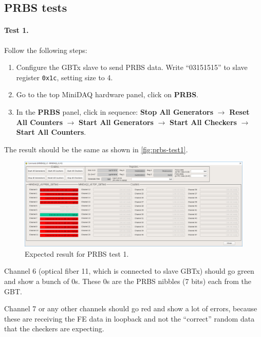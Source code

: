 \subsection{PRBS tests}

\paragraph{Test 1.} Follow the following steps:
\begin{enumerate}
    \item Configure the GBTx slave to send PRBS data. Write ``03151515'' to
        slave register \texttt{0x1c}, setting size to 4.
    \item Go to the top MiniDAQ hardware panel, click on \textbf{PRBS}.
    \item In the \textbf{PRBS} panel, click in sequence:
        \textbf{Stop All Generators} $\to$ \textbf{Reset All Counters} $\to$
        \textbf{Start All Generators} $\to$ \textbf{Start All Checkers} $\to$
        \textbf{Start All Counters}.
\end{enumerate}

The result should be the same as shown in \autoref{fig:prbs-test1}.

\begin{figure}[ht]
    \centering
    \includegraphics[width=\textwidth]{res/prbs_test1.png}
    \caption{Expected result for PRBS test 1.}
    \label{fig:prbs-test1}
\end{figure}

\begin{leftbar}
    Channel 6 (optical fiber 11, which is connected to slave GBTx) should go
    green and show a bunch of 0s.
    These 0s are the PRBS nibbles (7 bits) each from the GBT.
\end{leftbar}

\begin{leftbar}
    Channel 7 or any other channels should go red and show a lot of errors,
    because these are receiving the FE data in loopback and not the ``correct''
    random data that the checkers are expecting.
\end{leftbar}

